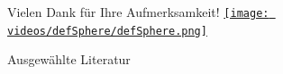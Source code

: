 \documentclass{beamer}
\begin{document}
  \begin{frame}
    \begin{block}{\huge Vielen Dank für Ihre Aufmerksamkeit! }
      \centering\href{run:videos/defSphere/runVideo.sh}{\texttt{[image: videos/defSphere/defSphere.png]}}
    \end{block}
  \end{frame}

  \begin{frame}
    \begin{block}{Ausgewählte Literatur}
      \footnotesize
      \nocite{hirani}\nocite{marsden}\nocite{jaenich}\nocite{meshCooper}
      
      {}
    \end{block}
  \end{frame}
\end{document}
